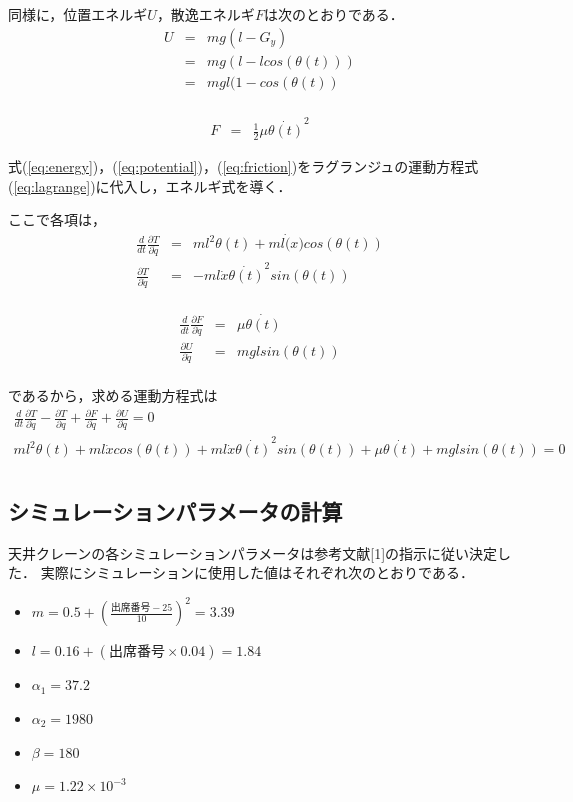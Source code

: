 \documentclass[dvipdfmx,titlepage,a4j]{jsarticle}  %
\begin{document}
同様に，位置エネルギ$U$，散逸エネルギ$F$は次のとおりである．
\begin{eqnarray}
  U &=& mg(l - G_y) \nonumber \\
  &=& mg(l - l cos(\theta(t))) \nonumber \\
  &=& mgl(1 - cos(\theta(t)) \label{eq:potential}\\
\end{eqnarray}

\begin{eqnarray}
  F &=& \frac{1}{2} \mu  \dot{\theta(t)}^2 \label{eq:friction}
\end{eqnarray}

式(\ref{eq:energy})，(\ref{eq:potential})，(\ref{eq:friction})をラグランジュの運動方程式(\ref{eq:lagrange})に代入し，エネルギ式を導く．

ここで各項は，
\begin{eqnarray}
  \frac{d}{dt} \frac{\partial T}{\partial \dot{q}} &=& m l^2 \theta(t) + m l \dot(x) cos(\theta(t)) \nonumber \\
  \frac{\partial T}{\partial \dot{q}} &=&  -m l \dot x \dot{\theta(t)}^2 sin(\theta(t))\nonumber \\
\end{eqnarray}

\begin{eqnarray}
  \frac{d}{dt} \frac{\partial F}{\partial \dot{q}} &=&  \mu \dot{\theta(t)} \nonumber \\
  \frac{\partial U}{\partial \dot{q}} &=&  mgl sin(\theta(t)) \nonumber \\
\end{eqnarray}

であるから，求める運動方程式は
\begin{eqnarray}
  \frac{d}{dt} \frac{\partial T}{\partial \dot{q}} - \frac{\partial T}{\partial q} + \frac{\partial F}{\partial \dot q} + \frac{\partial U}{\partial \dot q} = 0 \nonumber \\
  m l^2 \theta(t) + m l \dot x cos(\theta(t)) + m l \dot x \dot{\theta(t)}^2 sin(\theta(t)) + \mu \dot{\theta(t)} + mgl sin(\theta(t)) = 0 \nonumber \\
\end{eqnarray}

\subsection{シミュレーションパラメータの計算}
天井クレーンの各シミュレーションパラメータは参考文献[1]の指示に従い決定した．
実際にシミュレーションに使用した値はそれぞれ次のとおりである．
\begin{itemize}
  \item $m = 0.5 + (\frac{出席番号 - 25}{10})^2 = 3.39$
  \item $l = 0.16 + (出席番号 \times 0.04) = 1.84$
  \item $\alpha_1 = 37.2$
  \item $\alpha_2 = 1980$
  \item $\beta = 180$
  \item $\mu = 1.22 \times  10^{-3}$
\end{itemize}
\end{document}
